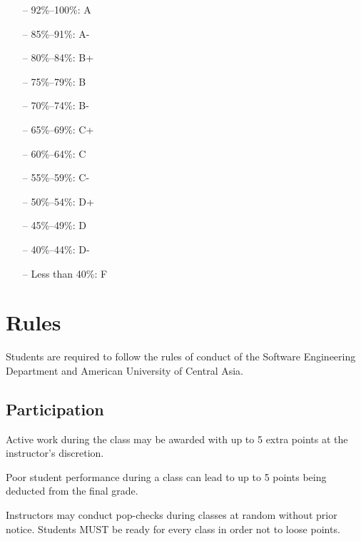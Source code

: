 \documentclass[12pt,a4paper,oneside]{article}
\begin{document}
        \begin{itemize} \itemsep-10pt \parskip0pt 
            \item[--] 92\%--100\%: A\\
            \item[--] 85\%--91\%: A-\\
            \item[--] 80\%--84\%: B+\\
            \item[--] 75\%--79\%: B\\
            \item[--] 70\%--74\%: B-\\
            \item[--] 65\%--69\%: C+\\
            \item[--] 60\%--64\%: C\\
            \item[--] 55\%--59\%: C-\\
            \item[--] 50\%--54\%: D+\\
            \item[--] 45\%--49\%: D\\
            \item[--] 40\%--44\%: D-\\
            \item[--] Less than 40\%: F
        \end{itemize}

    \section{Rules}

        Students are required to follow the rules of conduct of the Software
        Engineering Department and American University of Central Asia.

    \subsection{Participation}

        Active work during the class may be awarded with up to 5 extra points at
        the instructor’s discretion.

        Poor student performance during a class can lead to up to 5 points being
        deducted from the final grade.

        Instructors may conduct pop-checks during classes at random without
        prior notice. Students MUST be ready for every class in order not to
        loose points.
\end{document}
